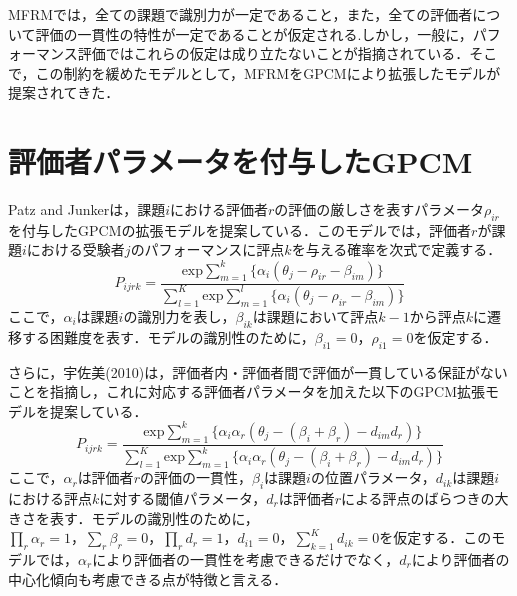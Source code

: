 \documentclass[a4paper,11pt,oneside,openany]{jsbook}
\begin{document}
MFRMでは，全ての課題で識別力が一定であること，また，全ての評価者について評価の一貫性の特性が一定であることが仮定される.しかし，一般に，パフォーマンス評価ではこれらの仮定は成り立たないことが指摘されている\cite{RashUsami,IRTUtoUeno}．そこで，この制約を緩めたモデルとして，MFRMをGPCMにより拡張したモデルが提案されてきた．

\section{評価者パラメータを付与したGPCM}
Patz and Junkerは，課題$i$における評価者$r$の評価の厳しさを表すパラメータ$\rho_{ir}$を付与したGPCMの拡張モデルを提案している\cite{raterGPCM}．このモデルでは，評価者$r$が課題$i$における受験者$j$のパフォーマンスに評点$k$を与える確率を次式で定義する．
\begin{displaymath}
P_{ijrk}=\frac{\mathrm{exp}\sum_{m=1}^{k}\{\alpha_i(\theta_{j}-\rho_{ir}-\beta_{im})\}}{\sum_{l=1}^{K}\mathrm{exp}\sum_{m=1}^{l}\{\alpha_i(\theta_{j}-\rho_{ir}-\beta_{im})\}}
\end{displaymath}
ここで，$\alpha_i$は課題$i$の識別力を表し，$\beta_{ik}$は課題において評点$k-1$から評点$k$に遷移する困難度を表す．モデルの識別性のために，$\beta_{i1}=0，\rho_{i1}=0$を仮定する．

さらに，宇佐美(2010)は，評価者内・評価者間で評価が一貫している保証がないことを指摘し，これに対応する評価者パラメータを加えた以下のGPCM拡張モデルを提案している．
\begin{displaymath}
P_{ijrk}=\frac{\mathrm{exp}\sum_{m=1}^{k}\{\alpha_i\alpha_r(\theta_{j}-(\beta_{i}+\beta_{r})-d_{im}d_r)\}}{\sum_{l=1}^{K}\mathrm{exp}\sum_{m=1}^{k}\{\alpha_i\alpha_r(\theta_{j}-(\beta_{i}+\beta_{r})-d_{im}d_r)\}}
\end{displaymath}
ここで，$\alpha_r$は評価者$r$の評価の一貫性，$\beta_i$は課題$i$の位置パラメータ，$d_{ik}$は課題$i$における評点$k$に対する閾値パラメータ，$d_r$は評価者$r$による評点のばらつきの大きさを表す．モデルの識別性のために，$\prod_{r}\alpha_r=1，\sum_{r}\beta_r=0，\prod_{r}d_r=1，d_{i1}=0，\sum_{k=1}^{K}d_{ik}=0$を仮定する．このモデルでは，$\alpha_r$により評価者の一貫性を考慮できるだけでなく，$d_r$により評価者の中心化傾向も考慮できる点が特徴と言える．
\end{document}

